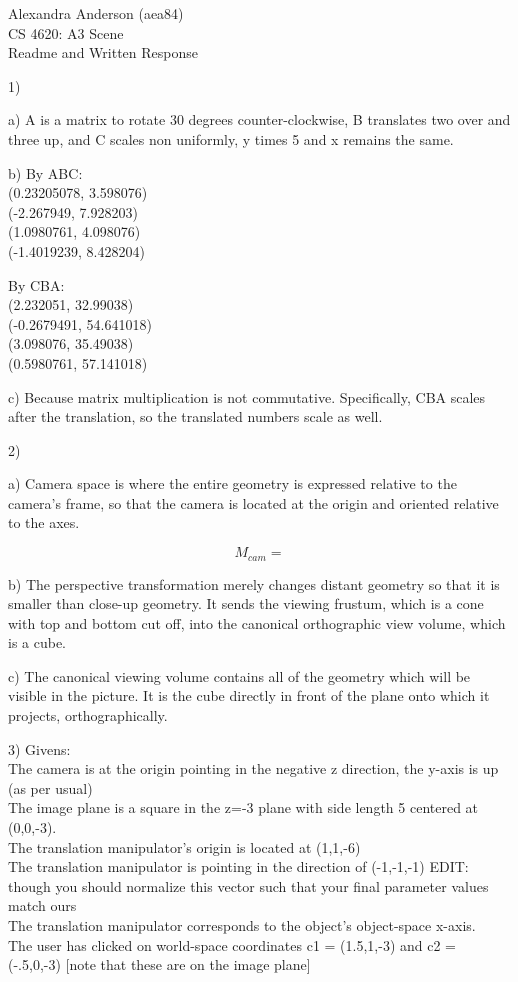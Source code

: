 \documentclass{letter}
\begin{document}
Alexandra Anderson (aea84)
\\CS 4620: A3 Scene
\\Readme and Written Response

1) 

a) A is a matrix to rotate 30 degrees counter-clockwise, B translates two over and three up, and C scales non uniformly, y times 5 and x remains the same. 

b)
By ABC: 
\\({0.23205078, 3.598076})
\\({-2.267949, 7.928203})
\\({1.0980761, 4.098076})
\\({-1.4019239, 8.428204})

By CBA: 
\\({2.232051, 32.99038})
\\({-0.2679491, 54.641018})
\\({3.098076, 35.49038})
\\({0.5980761, 57.141018})

c) Because matrix multiplication is not commutative. Specifically, CBA scales after the translation, so the translated numbers scale as well.

2) 

a) Camera space is where the entire geometry is expressed relative to the camera's frame, so that the camera is located at the origin and oriented relative to the axes.

$$M_{cam} = $$

b) The perspective transformation merely changes distant geometry so that it is smaller than close-up geometry. It sends the viewing frustum, which is a cone with top and bottom cut off, into the canonical orthographic view volume, which is a cube. 

c) The canonical viewing volume contains all of the geometry which will be visible in the picture. It is the cube directly in front of the plane onto which it projects, orthographically. 

3)
Givens:
\\The camera is at the origin pointing in the negative z direction, the y-axis is up (as per usual)
\\The image plane is a square in the z=-3 plane with side length 5 centered at (0,0,-3).
\\The translation manipulator's origin is located at (1,1,-6)
\\The translation manipulator is pointing in the direction of (-1,-1,-1) EDIT: though you should normalize this vector such that your 
final parameter values match ours
\\The translation manipulator corresponds to the object's object-space x-axis.
\\The user has clicked on world-space coordinates c1 = (1.5,1,-3) and c2 = (-.5,0,-3) [note that these are on the image plane]
\end{document}
